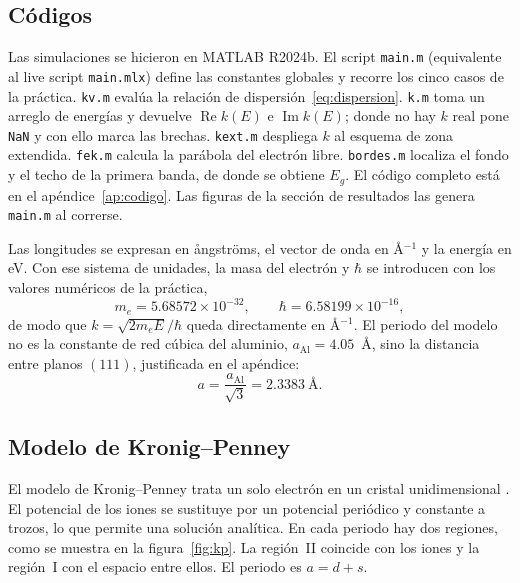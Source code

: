 \documentclass[hidelinks]{article}
\begin{document}
\subsection{Códigos}

Las simulaciones se hicieron en MATLAB R2024b. El script \texttt{main.m} (equivalente al live script \texttt{main.mlx}) define las constantes globales y recorre los cinco casos de la práctica. \texttt{kv.m} evalúa la relación de dispersión~\eqref{eq:dispersion}. \texttt{k.m} toma un arreglo de energías y devuelve $\operatorname{Re}k(E)$ e $\operatorname{Im}k(E)$; donde no hay $k$ real pone \texttt{NaN} y con ello marca las brechas. \texttt{kext.m} despliega $k$ al esquema de zona extendida. \texttt{fek.m} calcula la parábola del electrón libre. \texttt{bordes.m} localiza el fondo y el techo de la primera banda, de donde se obtiene $E_g$. El código completo está en el apéndice~\ref{ap:codigo}. Las figuras de la sección de resultados las genera \texttt{main.m} al correrse.

Las longitudes se expresan en ångströms, el vector de onda en \AA$^{-1}$ y la energía en eV. Con ese sistema de unidades, la masa del electrón y $\hbar$ se introducen con los valores numéricos de la práctica,
\begin{equation}
m_e=5.68572\times 10^{-32},\qquad
\hbar=6.58199\times 10^{-16},
\end{equation}
de modo que $k=\sqrt{2m_e E}/\hbar$ queda directamente en \AA$^{-1}$. El periodo del modelo no es la constante de red cúbica del aluminio, $a_{\mathrm{Al}}=4.05$~\AA, sino la distancia entre planos $(111)$, justificada en el apéndice:
\begin{equation}
a=\frac{a_{\mathrm{Al}}}{\sqrt{3}}=2.3383~\text{\AA}.
\label{eq:a111}
\end{equation}



\subsection{Modelo de Kronig--Penney}

El modelo de Kronig--Penney trata un solo electrón en un cristal unidimensional \cite{kronig1931}. El potencial de los iones se sustituye por un potencial periódico y constante a trozos, lo que permite una solución analítica. En cada periodo hay dos regiones, como se muestra en la figura~\ref{fig:kp}. La región~II coincide con los iones y la región~I con el espacio entre ellos. El periodo es $a=d+s$.
\end{document}
